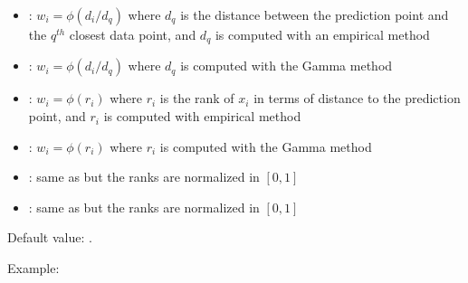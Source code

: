 \documentclass[letterpaper,10pt,english]{sphinxmanual}
\begin{document}
\begin{itemize}
\begin{description}
\begin{itemize}
\item {} 
\sphinxAtStartPar
{}: \(w_i=\phi(d_i/d_q)\) where \(d_q\) is the distance between the prediction point and the \(q^{th}\) closest data point, and \(d_q\) is computed with an empirical method

\item {} 
\sphinxAtStartPar
{}: \(w_i=\phi(d_i/d_q)\) where \(d_q\) is computed with the Gamma method

\item {} 
\sphinxAtStartPar
{}: \(w_i=\phi(r_i)\) where \(r_i\) is the rank of \(x_i\) in terms of distance to the prediction point, and \(r_i\) is computed with empirical method

\item {} 
\sphinxAtStartPar
{}: \(w_i=\phi(r_i)\) where \(r_i\) is computed with the Gamma method

\item {} 
\sphinxAtStartPar
{}: same as  but the ranks are normalized in \([0,1]\)

\item {} 
\sphinxAtStartPar
{}: same as  but the ranks are normalized in \([0,1]\)

\end{itemize}

\begin{DUlineblock}{0em}
\item[] 
\item[] Default value: .
\end{DUlineblock}

\begin{DUlineblock}{0em}
\item[] Example:
\item[] 
\end{DUlineblock}

\end{description}


\end{itemize}
\end{document}
